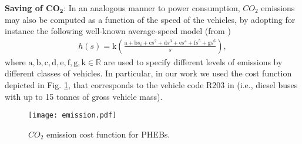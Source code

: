 \documentclass[journal]{IEEEtran}
\begin{document}
\textbf{Saving of $\pmb {CO_2}$}: In an analogous manner to power consumption, $CO_2$ emissions may also be computed as a function of the speed of the vehicles, by adopting for instance the following well-known average-speed model (from \cite{emfactor}) 
\begin{equation}
\begin{gathered}
h(s)=
\text{k}\left(\frac{\text{a} + \text{b}s_{i}+ \text{c}s^{2}+ \text{d}s^{3}+ \text{e}s^{4}+ \text{f}s^{5}+ \text{g}s^{6}}
{s}\right),
\end{gathered}
\end{equation}
where $\text{a},\text{b},\text{c},\text{d},\text{e},\text{f},\text{g},\text{k} \in \mathbb{R}$ are used to specify different levels of emissions by different classes of vehicles. In particular, in our work we used the cost function depicted in Fig. \ref{CO2emission}, that corresponds to the vehicle code R203 in \cite{emfactor} (i.e., diesel buses with up to 15 tonnes of gross vehicle mass).
\begin{figure}[htbp]
	\begin{center}
		{\texttt{[image: emission.pdf]}}
		\caption{$CO_2$ emission cost function for PHEBs.}
		\label{CO2emission}
	\end{center}
\end{figure}
\newline
\end{document}
